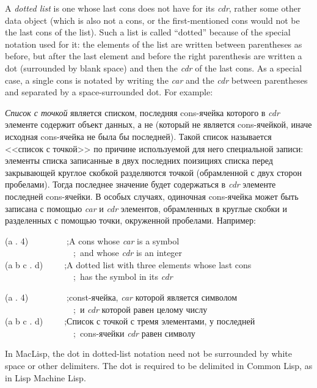 A \emph{dotted list} is one whose last cons does not have {\nil} for
its \emph{cdr}, rather some other data object (which is also not a cons,
or the first-mentioned cons would not be the last cons of the list).
Such a list is called ``dotted'' because of the special notation
used for it: the elements of the list are written between
parentheses as before, but after the last element and before
the right parenthesis are written a dot (surrounded by blank space)
and then the \emph{cdr} of the last cons.  As a special case,
a single cons is notated by writing the \emph{car} and the \emph{cdr} between
parentheses and separated by a space-surrounded dot.
For example:

\emph{Список с точкой} является списком, последняя cons-ячейка которого в {\it
  cdr} элементе содержит
объект данных, а не {\nil} (который не является
cons-ячейкой, иначе исходная cons-ячейка не была бы последней).
Такой список называется <<список с точкой>> по причине используемой для него
специальной записи: элементы списка записанные в двух последних поизициях списка
перед закрывающей круглое скобкой разделяются точкой (обрамленной с двух сторон
пробелами). Тогда последнее значение будет содержаться в \emph{cdr} элементе
последней cons-ячейки. В особых случаях, одиночная cons-ячейка может быть
записана с помощью \emph{car} и \emph{cdr} элементов, обрамленных в круглые скобки
и разделенных с помощью точки, окруженной пробелами. 
Например:
\begin{lisp}
(a . 4)~~~~~~~~~;\textrm{A cons whose \emph{car} is a symbol} \\
~~~~~~~~~~~~~~~~;~\textrm{and whose \emph{cdr} is an integer} \\
(a b c . d)~~~~~;\textrm{A dotted list with three elements whose last cons} \\
~~~~~~~~~~~~~~~~;~\textrm{has the symbol  in its \emph{cdr}}
\end{lisp}

\begin{lisp}
(a . 4)~~~~~~~~~;\textrm{const-ячейка, \emph{car} которой является символом} \\
~~~~~~~~~~~~~~~~;~\textrm{и \emph{cdr} которой равен целому числу} \\
(a b c . d)~~~~~;\textrm{Список с точкой с тремя элементами, у последней} \\
~~~~~~~~~~~~~~~~;~\textrm{cons-ячейки \emph{cdr} равен символу }
\end{lisp}

\beforenoterule
\begin{incompatibility}
In MacLisp, the dot in dotted-list notation
need not be surrounded by white space or other delimiters.
The dot is required to be delimited in Common Lisp, as in Lisp Machine Lisp.
\end{incompatibility}
\afternoterule

